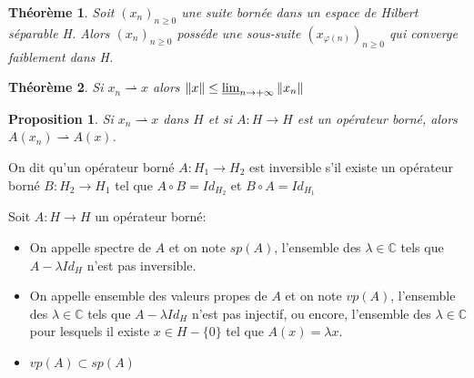 \documentclass[10pt,a4paper,oneside]{article}
\newtheorem{theoreme}{Théorème}
\newtheorem{proposition}{Proposition}
\newenvironment{definition}[1][Definition]{\begin{trivlist}
\item[\hskip \labelsep {\bfseries #1}]}{\end{trivlist}}
\begin{document}
\begin{theoreme}
Soit $(x_n)_{n\geq0}$ une suite bornée dans un espace de Hilbert séparable H. Alors $(x_n)_{n\geq0}$ posséde une sous-suite $(x_{\varphi(n)})_{n\geq0}$ qui converge faiblement dans H.
\end{theoreme}


\begin{theoreme}
Si $x_n \rightharpoonup x$ alors $\| x \| \leq \varliminf_{n \to +\infty} \| x_n \|$
\end{theoreme}


\begin{proposition}
Si $x_n \rightharpoonup x$ dans $H$ et si $A: H \rightarrow H$ est un opérateur borné, alors $A(x_n) \rightharpoonup A(x)$.
\end{proposition}


\begin{definition}
On dit qu'un opérateur borné $A: H_{1} \rightarrow H_{2}$ est inversible s'il existe un opérateur borné $B: H_{2} \rightarrow H_{1}$ tel que $A \circ B = Id_{H_{2}}$ et $B \circ A = Id_{H_{1}}$
\end{definition}


\begin{definition}
Soit $A: H \rightarrow H$ un opérateur borné:

\begin{itemize}

\item
On appelle spectre de $A$  et on note $sp(A)$, l'ensemble des $\lambda \in \mathbb{C}$ tels que $A - \lambda Id_{H}$ n'est pas inversible.

\item
On appelle ensemble des valeurs propes de $A$ et on note $vp(A)$, l'ensemble des $\lambda \in \mathbb{C}$ tels que $A - \lambda Id_{H}$ n'est pas injectif, ou encore, l'ensemble des $\lambda \in \mathbb{C}$ pour lesquels il existe $x \in H - \{0\}$ tel que $A(x) = \lambda x$.

\item
$vp(A) \subset sp(A)$

\end{itemize}

\end{definition}
\end{document}
